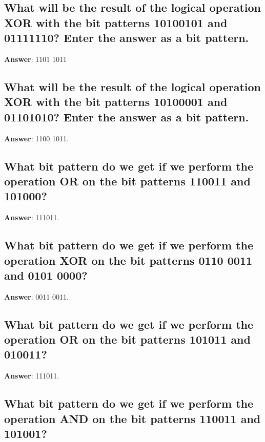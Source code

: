 \documentclass[a4paper,11pt,oneside]{article}
\begin{document}
\begin{sloppypar}
\subsection{What will be the result of the logical operation XOR with the bit patterns 10100101 and 01111110? Enter the answer as a bit pattern.}

\label{q:410:sa:en:True}

\textbf{Answer}: 1101 1011



\subsection{What will be the result of the logical operation XOR with the bit patterns 10100001 and 01101010? Enter the answer as a bit pattern.}

\label{q:411:sa:en:True}

\textbf{Answer}: 1100 1011.



\subsection{What bit pattern do we get if we perform the operation OR on the bit patterns 110011 and 101000?}

\label{q:412:sa:en:True}

\textbf{Answer}: 111011.



\subsection{What bit pattern do we get if we perform the operation XOR on the bit patterns 0110 0011 and 0101 0000?}

\label{q:413:sa:en:True}

\textbf{Answer}: 0011 0011.



\subsection{What bit pattern do we get if we perform the operation OR on the bit patterns 101011 and 010011?}

\label{q:414:sa:en:True}

\textbf{Answer}: 111011.



\subsection{What bit pattern do we get if we perform the operation AND on the bit patterns 110011 and 101001?}


\end{sloppypar}
\end{document}
